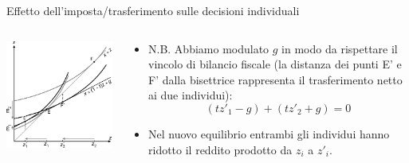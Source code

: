 \documentclass[11pt]{beamer}
\begin{document}
\begin{frame}{Effetto dell'imposta/trasferimento sulle decisioni individuali}
\begin{columns}
\begin{column}{.55\columnwidth}
\begin{center}
\includegraphics[width=\textwidth]{./figure/effetto-distorsivo-imposte-ql-3.pdf}
\end{center}
\end{column}


\begin{column}{.45\columnwidth}
\begin{itemize}
\item N.B. Abbiamo modulato $g$ in modo da rispettare il vincolo di bilancio
fiscale (la distanza dei punti E' e F' dalla bisettrice rappresenta il
trasferimento netto ai due individui):
$$ (tz'_1-g)+(tz'_2+g)=0 $$
\item Nel nuovo equilibrio entrambi gli individui hanno ridotto il reddito
prodotto da $z_i$ a $z'_i$.
\end{itemize}
\end{column}
\end{columns}
\end{frame}
\end{document}
